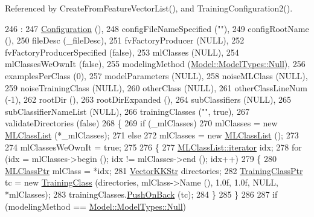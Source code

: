 Referenced by Create\+From\+Feature\+Vector\+List(), and Training\+Configuration2().


\begin{DoxyCode}
246                                                 :
247   \hyperlink{class_k_k_b_1_1_configuration_a779947337bf652f0e773cb29f37f14ba}{Configuration}              (),
248   configFileNameSpecified    (\textcolor{stringliteral}{""}),
249   configRootName             (),
250   fileDesc                   (\_fileDesc),
251   fvFactoryProducer          (NULL),
252   fvFactoryProducerSpecified (\textcolor{keyword}{false}),
253   mlClasses                  (NULL),
254   mlClassesWeOwnIt           (\textcolor{keyword}{false}),
255   modelingMethod             (\hyperlink{class_k_k_m_l_l_1_1_model_aeda4060e088c67446ca993eefcecea06abbb93ef26e3c101ff11cdd21cab08a94}{Model::ModelTypes::Null}),
256   examplesPerClass           (0),
257   modelParameters            (NULL),
258   noiseMLClass               (NULL),
259   noiseTrainingClass         (NULL),
260   otherClass                 (NULL),
261   otherClassLineNum          (-1),
262   rootDir                    (),
263   rootDirExpanded            (),
264   subClassifiers             (NULL),
265   subClassifierNameList      (NULL),
266   trainingClasses            (\textcolor{stringliteral}{""}, \textcolor{keyword}{true}),
267   validateDirectories        (\textcolor{keyword}{false})
268 \{
269   \textcolor{keywordflow}{if}  (\_mlClasses)
270     mlClasses = \textcolor{keyword}{new} \hyperlink{class_k_k_m_l_l_1_1_m_l_class_list}{MLClassList} (*\_mlClasses);
271   \textcolor{keywordflow}{else}
272     mlClasses = \textcolor{keyword}{new} \hyperlink{class_k_k_m_l_l_1_1_m_l_class_list}{MLClassList} ();
273 
274   mlClassesWeOwnIt = \textcolor{keyword}{true};
275 
276   \{
277     \hyperlink{class_k_k_b_1_1_k_k_queue_aa3c2796a726eea468b94132a9fbf2cfe}{MLClassList::iterator} idx;
278     \textcolor{keywordflow}{for}  (idx = mlClasses->begin ();  idx != mlClasses->end ();  idx++)
279     \{
280       \hyperlink{class_k_k_m_l_l_1_1_m_l_class}{MLClassPtr} mlClass = *idx;
281       \hyperlink{class_k_k_b_1_1_vector_k_k_str}{VectorKKStr}  directories;
282       \hyperlink{class_k_k_m_l_l_1_1_training_class}{TrainingClassPtr}  tc = \textcolor{keyword}{new} \hyperlink{class_k_k_m_l_l_1_1_training_class}{TrainingClass} (directories, mlClass->Name (),
       1.0f, 1.0f, NULL, *mlClasses);
283       trainingClasses.\hyperlink{class_k_k_b_1_1_k_k_queue_aa9fba4632b54268bf71ecb42dee0b575}{PushOnBack} (tc);
284     \}
285   \}
286 
287   \textcolor{keywordflow}{if}  (modelingMethod == \hyperlink{class_k_k_m_l_l_1_1_model_aeda4060e088c67446ca993eefcecea06abbb93ef26e3c101ff11cdd21cab08a94}{Model::ModelTypes::Null})

\end{DoxyCode}
